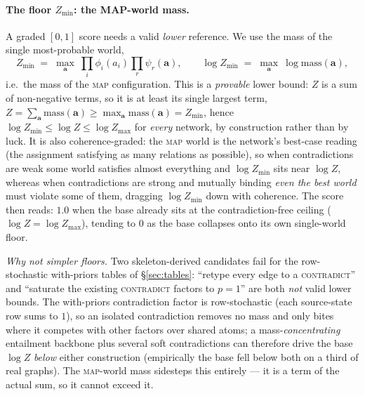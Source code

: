 \documentclass[11pt]{article}
\begin{document}
\paragraph{The floor $Z_{\min}$: the MAP-world mass.} A graded $[0,1]$ score needs a valid
\emph{lower} reference. We use the mass of the single most-probable world,
\begin{equation}
  Z_{\min}\;=\;\max_{\mathbf a}\ \prod_i\phi_i(a_i)\prod_r\psi_r(\mathbf a),
  \qquad
  \log Z_{\min}\;=\;\max_{\mathbf a}\ \log\mathrm{mass}(\mathbf a),
  \label{eq:zmin}
\end{equation}
i.e.\ the mass of the \textsc{map} configuration. This is a \emph{provable} lower bound:
$Z$ is a sum of non-negative terms, so it is at least its single largest term,
$Z=\sum_{\mathbf a}\mathrm{mass}(\mathbf a)\ge\max_{\mathbf a}\mathrm{mass}(\mathbf a)=Z_{\min}$,
hence $\log Z_{\min}\le\log Z\le\log Z_{\max}$ for \emph{every} network, by construction rather
than by luck. It is also coherence-graded: the \textsc{map} world is the network's best-case
reading (the assignment satisfying as many relations as possible), so when contradictions are
weak some world satisfies almost everything and $\log Z_{\min}$ sits near $\log Z$, whereas
when contradictions are strong and mutually binding \emph{even the best world} must violate
some of them, dragging $\log Z_{\min}$ down with coherence. The score then reads: $1.0$ when
the base already sits at the contradiction-free ceiling ($\log Z=\log Z_{\max}$), tending to
$0$ as the base collapses onto its own single-world floor.

\emph{Why not simpler floors.} Two skeleton-derived candidates fail for the row-stochastic
with-priors tables of \S\ref{sec:tables}: ``retype every edge to a \textsc{contradict}'' and
``saturate the existing \textsc{contradict} factors to $p{=}1$'' are both \emph{not} valid
lower bounds. The with-priors contradiction factor is row-stochastic (each source-state row
sums to $1$), so an isolated contradiction removes no mass and only bites where it competes
with other factors over shared atoms; a mass-\emph{concentrating} entailment backbone plus
several soft contradictions can therefore drive the base $\log Z$ \emph{below} either
construction (empirically the base fell below both on a third of real graphs). The
\textsc{map}-world mass sidesteps this entirely --- it is a term of the actual sum, so it
cannot exceed it.
\end{document}
